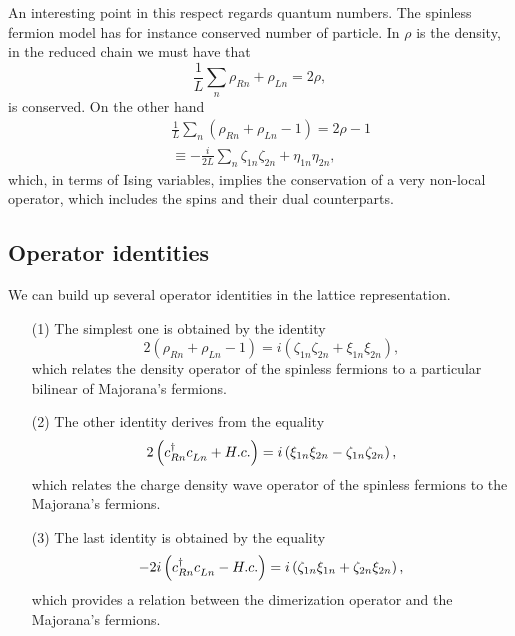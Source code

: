 An interesting point in this respect regards quantum numbers. The spinless
fermion model has for instance conserved number of particle. In $\rho$
is the density, in the reduced chain we must have that
\begin{equation}
\frac{1}{L}\sum_n \rho_{Rn}+\rho_{Ln} = 2\rho,
\label{conserved}
\end{equation}
is conserved. On the other hand
\begin{eqnarray*}
&&\frac{1}{L}\sum_n (\rho_{Rn}+\rho_{Ln} -1) = 2\rho-1\\
&&\equiv -\frac{i}{2L}\sum_n \zeta_{1n}\zeta_{2n} + \eta_{1n}\eta_{2n},
\end{eqnarray*}
which, in terms of Ising variables, implies the conservation of a very
non-local operator, which includes the spins and their dual counterparts.

\subsection{Operator identities}
We can build up several operator identities in the lattice
representation.

\begin{itemize}
\item[(1)]The simplest one is obtained by the identity
\begin{equation}
2\left( \rho_{Rn}+\rho_{Ln} -1 \right) =
i\left(
\zeta_{1n}\zeta_{2n} + \xi_{1n}\xi_{2n}\right),
\label{ID:1}
\end{equation}
which relates the density operator of the spinless fermions to
a particular bilinear of Majorana's fermions.

\item[(2)] The other identity derives from the equality
\begin{equation}
2\left(c^\dagger_{Rn}c^\pdag_{Ln}+ H.c.\right) =
i\left(\xi_{1n}\xi_{2n}-\zeta_{1n}\zeta_{2n}\right),
\label{B:CDW}
\end{equation}
which relates the charge density wave operator of the
spinless fermions to the Majorana's fermions.

\item[(3)] The last identity is obtained by the equality
\begin{equation}
-2i\left(c^\dagger_{Rn}c^\pdag_{Ln}-H.c.\right) =
i\left(\zeta_{1n}\xi_{1n}+\zeta_{2n}\xi_{2n}\right),
\label{B:dimerization}
\end{equation}
which provides a relation between the dimerization operator and the
Majorana's fermions.

\end{itemize}

